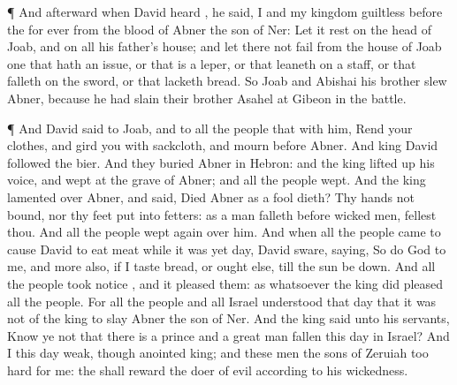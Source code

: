 {\par }{\PP {}¶ And
afterward when
David
heard
{}, he
said, I and my
kingdom
{}
guiltless before the
{}
for
ever from the
blood of
Abner the
son of
Ner:
Let it
rest on the
head of
Joab, and on all his
father’s
house; and let there not
fail from the
house of
Joab one that hath an
issue, or that is a
leper, or that
leaneth on a
staff, or that
falleth on the
sword, or that
lacketh
bread.
So
Joab and
Abishai his
brother
slew
Abner, because he had
slain their
brother
Asahel at
Gibeon in the
battle.
\par }{\PP {}¶ And
David
said to
Joab, and to all the
people that
{} with him,
Rend your
clothes, and
gird you with
sackcloth, and
mourn
before
Abner. And
king
David
{}
followed the
bier.
And they
buried
Abner in
Hebron: and the
king lifted
up his
voice, and
wept at the
grave of
Abner; and all the
people
wept.
And the
king
lamented over
Abner, and
said,
Died
Abner as a
fool
dieth?
Thy
hands
{} not
bound, nor thy
feet
put into
fetters: as a man
falleth
before
wicked
men,
{}
fellest thou. And all the
people
wept
again over him.
And when
all the
people
came to
cause
David to
eat
meat while it was
yet
day,
David
sware,
saying, So
do
God to me, and more
also, if I
taste
bread, or
ought else,
till the
sun be
down.
And all the
people took
notice
{}, and it
pleased them: as whatsoever the
king
did
pleased all the
people.
For all the
people and all
Israel
understood that
day that it was not of the
king to
slay
Abner the
son of
Ner.
And the
king
said unto his
servants,
Know ye not that there is a
prince and a great
man
fallen this
day in
Israel?
And I
{} this
day
weak, though
anointed
king; and these
men the
sons of
Zeruiah
{} too
hard for me: the
{} shall
reward the doer of
evil according to his
wickedness.

}
